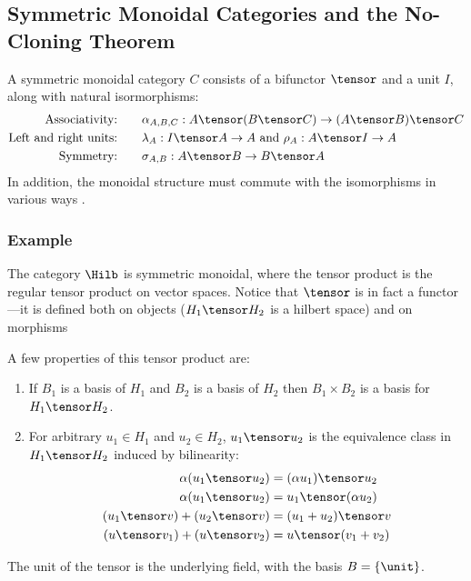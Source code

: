\subsection{Symmetric Monoidal Categories and the No-Cloning Theorem}

\begin{definition}
A symmetric monoidal category $C$ consists of a bifunctor $\tensor$
and a unit $I$, along with natural isormorphisms:
\begin{align*}
    \text{Associativity:}&\qquad 
    \alpha_{A,B,C} : A \tensor (B \tensor C) \rightarrow (A \tensor B) \tensor C \\
    \text{Left and right units:}&\qquad 
    \lambda_A : I \tensor A \rightarrow A \text{ and } \rho_A : A \tensor I \rightarrow A \\
    \text{Symmetry:}&\qquad 
    \sigma_{A,B} : A \tensor B \rightarrow B \tensor A \\
\end{align*}
In addition, the monoidal structure must commute with the isomorphisms in 
various ways .
\end{definition}

\subsubsection*{Example}
The category $\Hilb$ is symmetric monoidal, where the tensor product
is the regular tensor product on vector spaces. Notice that $\tensor$ is
in fact a functor---it is defined both on objects ($H_1 \tensor H_2$ is a hilbert space)
and on morphisms

A few properties of this tensor
product are:
\begin{enumerate}
    \item If $B_1$ is a basis of $H_1$ and $B_2$ is a basis of $H_2$
    then $B_1 \times B_2$ is a basis for $H_1 \tensor H_2$.
    \item For arbitrary $u_1 \in H_1$ and $u_2 \in H_2$, 
    $u_1 \tensor u_2$ is the equivalence class in $H_1 \tensor H_2$ induced
    by bilinearity:
    \begin{align*}
        \alpha(u_1 \tensor u_2) &= (\alpha u_1) \tensor u_2 \\
        \alpha(u_1 \tensor u_2) &= u_1 \tensor (\alpha u_2) \\
        (u_1 \tensor v) + (u_2 \tensor v) &= (u_1 + u_2) \tensor v \\
        (u \tensor v_1) + (u \tensor v_2) &= u \tensor (v_1 + v_2)
    \end{align*}
\end{enumerate}
The unit of the tensor is the underlying field, with the basis $B = \{ \unit \}$.

